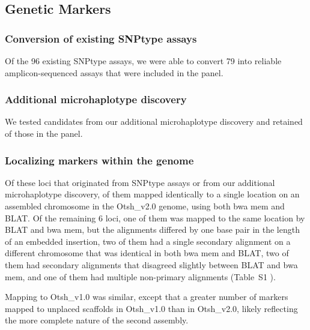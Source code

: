 \subsection*{Genetic Markers}

\subsubsection*{Conversion of existing SNPtype assays}

Of the 96 existing SNPtype assays, we were able to convert 79
into reliable amplicon-sequenced assays that were included in the panel.

\subsubsection*{Additional microhaplotype discovery} 

We tested  candidates from our additional microhaplotype discovery and
retained  of those in the panel.

\subsubsection*{Localizing markers within the genome}

Of these  loci that originated from SNPtype assays or from our additional
microhaplotype discovery,  of them mapped identically to a single
location on an assembled chromosome in the Otsh\_v2.0 genome, using both bwa mem and BLAT.
Of the remaining 6 loci, one of them was mapped to the same location by BLAT and bwa mem, but
the alignments differed by one base pair in the length of an embedded insertion, two of them had a single secondary alignment on a different chromosome
that was identical in both bwa mem and BLAT, two of them had secondary alignments that
disagreed slightly between BLAT and bwa mem, and one of them had multiple
non-primary alignments (Table~S1 ).

Mapping to Otsh\_v1.0 was similar, except that a greater number of markers mapped to unplaced
scaffolds in Otsh\_v1.0 than in Otsh\_v2.0, likely reflecting the more complete nature of the
second assembly.  

